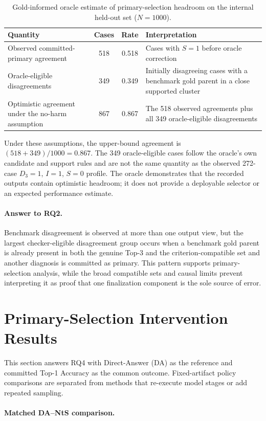 \begin{table}[htbp]
\centering
\caption{Gold-informed oracle estimate of primary-selection headroom on the internal held-out set ($N=1000$).}
\label{tab:oracle-headroom}
\small
\begin{tabularx}{\textwidth}{|>{\raggedright\arraybackslash}p{4.1cm}|c|c|X|}
\hline
Quantity & Cases & Rate & Interpretation\\
\hline
Observed committed-primary agreement & 518 & 0.518 & Cases with $S=1$ before oracle correction\\
\hline
Oracle-eligible disagreements & 349 & 0.349 & Initially disagreeing cases with a benchmark gold parent in a close supported cluster\\
\hline
Optimistic agreement under the no-harm assumption & 867 & 0.867 & The 518 observed agreements plus all 349 oracle-eligible disagreements\\
\hline
\end{tabularx}
\end{table}

Under these assumptions, the upper-bound agreement is $(518+349)/1000=0.867$. The 349 oracle-eligible cases follow the oracle's own candidate and support rules and are not the same quantity as the observed 272-case $D_3=1$, $I=1$, $S=0$ profile. The oracle demonstrates that the recorded outputs contain optimistic headroom; it does not provide a deployable selector or an expected performance estimate.

\paragraph{Answer to RQ2.}
Benchmark disagreement is observed at more than one output view, but the largest checker-eligible disagreement group occurs when a benchmark gold parent is already present in both the genuine Top-3 and the criterion-compatible set and another diagnosis is committed as primary. This pattern supports primary-selection analysis, while the broad compatible sets and causal limits prevent interpreting it as proof that one finalization component is the sole source of error.

\section{Primary-Selection Intervention Results}
\label{sec:nts-factorial}
\label{sec:additional-selection-results}

This section answers RQ4 with Direct-Answer (DA) as the reference and committed Top-1 Accuracy as the common outcome. Fixed-artifact policy comparisons are separated from methods that re-execute model stages or add repeated sampling.

\paragraph{Matched DA--NtS comparison.}
